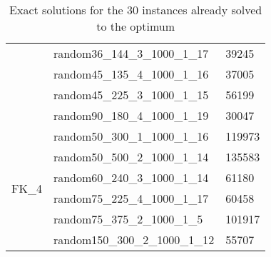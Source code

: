 \begin{table}[!htbp]
{\begin{tabular}{@{}lll@{}}
            & random36\_144\_3\_1000\_1\_17              & 39245  \\
            & random45\_135\_4\_1000\_1\_16              & 37005  \\
            & random45\_225\_3\_1000\_1\_15              & 56199  \\
            & random90\_180\_4\_1000\_1\_19              & 30047  \\ \midrule
            \multirow{6}{*}{FK\_4} & random50\_300\_1\_1000\_1\_16              & 119973 \\
            & random50\_500\_2\_1000\_1\_14              & 135583 \\
            & random60\_240\_3\_1000\_1\_14              & 61180  \\
            & random75\_225\_4\_1000\_1\_17              & 60458  \\
            & random75\_375\_2\_1000\_1\_5               & 101917 \\
            & random150\_300\_2\_1000\_1\_12             & 55707  \\ \bottomrule
        \end{tabular}
    }
    \caption{Exact solutions for the 30 instances already solved to the optimum}
    \label{tab:exact_opt}
\end{table}

